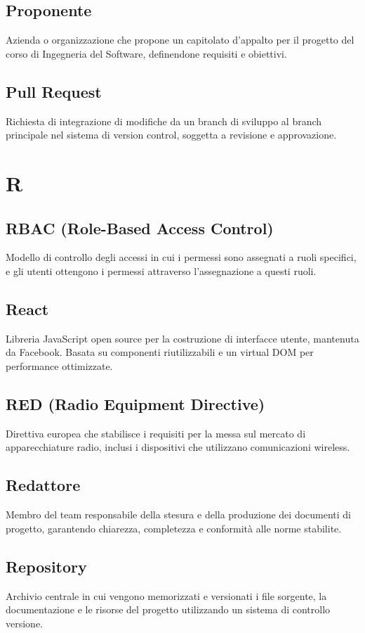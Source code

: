 \documentclass[a4paper,11pt]{article}
\begin{document}
\subsection{Proponente}
Azienda o organizzazione che propone un capitolato d'appalto per il progetto del corso di Ingegneria del Software, definendone requisiti e obiettivi.

\subsection{Pull Request}
Richiesta di integrazione di modifiche da un branch di sviluppo al branch principale nel sistema di version control, soggetta a revisione e approvazione.

\newpage
\section{R}

\subsection{RBAC (Role-Based Access Control)}
Modello di controllo degli accessi in cui i permessi sono assegnati a ruoli specifici, e gli utenti ottengono i permessi attraverso l'assegnazione a questi ruoli.

\subsection{React}
Libreria JavaScript open source per la costruzione di interfacce utente, mantenuta da Facebook. Basata su componenti riutilizzabili e un virtual DOM per performance ottimizzate.

\subsection{RED (Radio Equipment Directive)}
Direttiva europea che stabilisce i requisiti per la messa sul mercato di apparecchiature radio, inclusi i dispositivi che utilizzano comunicazioni wireless.

\subsection{Redattore}
Membro del team responsabile della stesura e della produzione dei documenti di progetto, garantendo chiarezza, completezza e conformità alle norme stabilite.

\subsection{Repository}
Archivio centrale in cui vengono memorizzati e versionati i file sorgente, la documentazione e le risorse del progetto utilizzando un sistema di controllo versione.
\end{document}
